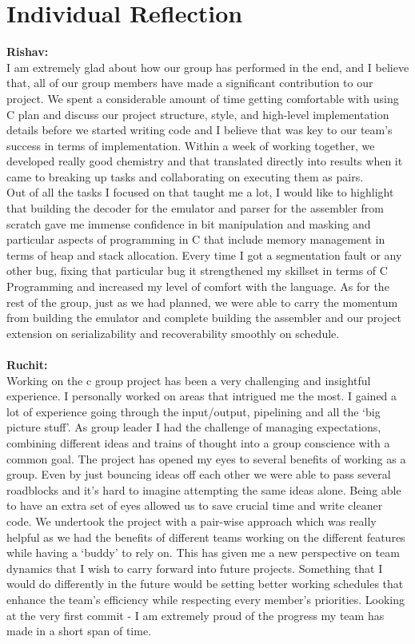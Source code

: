 \documentclass[a4paper]{article}
\begin{document}
\section{Individual Reflection}
\textbf{Rishav:}\\
I am extremely glad about how our group has performed in the end, and I believe that, all of our group members have made a significant contribution to our project. We spent a considerable amount of time getting comfortable with using C plan and discuss our project structure, style, and high-level implementation details before we started writing code and I believe that was key to our team’s success in terms of implementation. Within a week of working together, we developed really good chemistry and that translated directly into results when it came to breaking up tasks and collaborating on executing them as pairs.\\
Out of all the tasks I focused on that taught me a lot, I would like to highlight that building the decoder for the emulator and parser for the assembler from scratch gave me immense confidence in bit manipulation and masking and particular aspects of programming in C that include memory management in terms of heap and stack allocation. Every time I got a segmentation fault or any other bug, fixing that particular bug it strengthened my skillset in terms of C Programming and increased my level of comfort with the language. As for the rest of the group, just as we had planned, we were able to carry the momentum from building the emulator and complete building the assembler and our project extension on serializability and recoverability smoothly on schedule.
\\\\
\textbf{Ruchit:}\\
Working on the c group project has been a very challenging and insightful experience. I personally worked on areas that intrigued me the most. I gained a lot of experience going through the input/output, pipelining and all the ‘big picture stuff’.  As group leader I had the challenge of managing expectations, combining different ideas and trains of thought into a group conscience with a common goal. The project has opened my eyes to several benefits of working as a group. Even by just bouncing ideas off each other we were able to pass several
roadblocks and it’s hard to imagine attempting the same ideas alone. Being able to have an extra set of eyes allowed us to save crucial time and write cleaner code. We undertook the project with a pair-wise approach which was really helpful as we had the benefits of different teams working on the different features while having a ‘buddy’ to rely on. This has given me a new perspective on team dynamics that I wish to carry forward into future projects. Something that I would do differently in the future would be setting better working schedules that enhance the team’s efficiency while respecting every member’s priorities. Looking at the very first commit - I am extremely proud of the progress my team has made in a short span of time.
\end{document}
